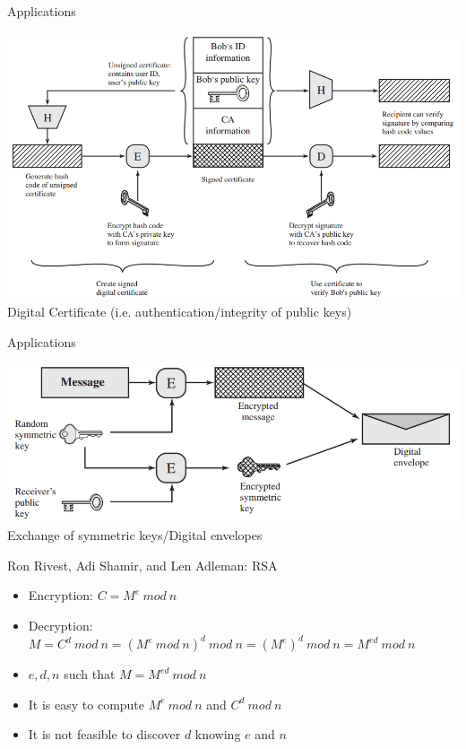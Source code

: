 \documentclass{beamer}
\begin{document}
\begin{frame}{Applications}
  \begin{center}
    \includegraphics[width=0.8\linewidth]{certificate}\\
  Digital Certificate (i.e. authentication/integrity of public keys)
  \end{center}
\end{frame}

\begin{frame}{Applications}
  \begin{center}
    \includegraphics[width=0.8\linewidth]{envelope}\\
  Exchange of symmetric keys/Digital envelopes
  \end{center}
\end{frame}


\begin{frame}{ Ron Rivest, Adi Shamir, and Len Adleman: RSA }
  \begin{itemize}
    \item Encryption: $C = M^e\ mod\ n$
    \item Decryption: $M = C^d\ mod\ n = (M^e\ mod\ n)^d\ mod\ n = (M^e)^d\ mod\ n = M^{ed}\ mod\ n$
    \item $e,d,n$ such that $M = M^{ed}\ mod\ n$
    \item It is easy to compute $M^e\ mod\ n$ and $C^d\ mod\ n$
    \item It is not feasible to discover $d$ knowing $e$ and $n$
  \end{itemize}
\end{frame}
\end{document}
